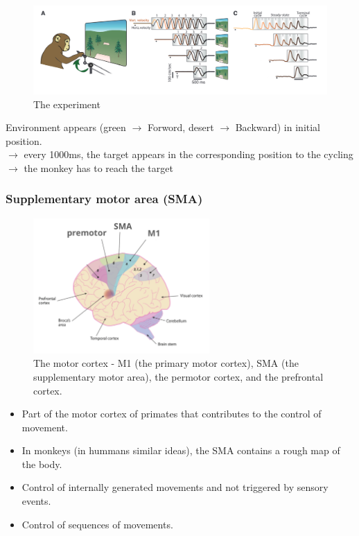 \documentclass[11pt]{book} %
\begin{document}
\begin{figure}[h]
    \centering
    \includegraphics[width=\textwidth]{./Figs/monkeyb1.jpeg}
    \caption{The experiment}
    \label{fig:entanglement_untangling}
\end{figure}

Environment appears (green $\rightarrow$ Forword, desert $\rightarrow$ Backward) in initial position. \\
$\longrightarrow$  every 1000ms, the target appears in the corresponding position to the cycling \\
$\longrightarrow$  the monkey has to reach the target \\



\subsubsection{Supplementary motor area (SMA)}

\begin{figure}[h]
    \centering
    \includegraphics[width=0.6\textwidth]{./Figs/monkey5.jpeg}
    \caption{The motor cortex - M1 (the primary motor cortex), SMA (the supplementary motor area), the permotor cortex, and the prefrontal cortex.}
    \label{fig:entanglement_untangling}
\end{figure}

\begin{itemize}
    \item Part of the motor cortex of primates that contributes to the control of movement.
    \item In monkeys (in hummans similar ideas), the SMA contains a rough map of the body.
    \item Control of internally generated movements and not triggered by sensory events.
    \item Control of sequences of movements.
\end{itemize}
\end{document}
